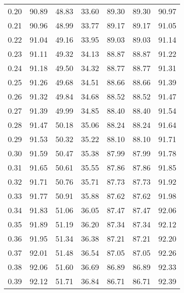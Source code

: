 \begin{tabular}{|c|c|c|c|c|c|c|}
      0.20 &     90.89 &     48.83 &      33.60 &   89.30 &      89.30 &         90.97 \\
      0.21 &     90.96 &     48.99 &      33.77 &   89.17 &      89.17 &         91.05 \\
      0.22 &     91.04 &     49.16 &      33.95 &   89.03 &      89.03 &         91.14 \\
      0.23 &     91.11 &     49.32 &      34.13 &   88.87 &      88.87 &         91.22 \\
      0.24 &     91.18 &     49.50 &      34.32 &   88.77 &      88.77 &         91.31 \\
      0.25 &     91.26 &     49.68 &      34.51 &   88.66 &      88.66 &         91.39 \\
      0.26 &     91.32 &     49.84 &      34.68 &   88.52 &      88.52 &         91.47 \\
      0.27 &     91.39 &     49.99 &      34.85 &   88.40 &      88.40 &         91.54 \\
      0.28 &     91.47 &     50.18 &      35.06 &   88.24 &      88.24 &         91.64 \\
      0.29 &     91.53 &     50.32 &      35.22 &   88.10 &      88.10 &         91.71 \\
      0.30 &     91.59 &     50.47 &      35.38 &   87.99 &      87.99 &         91.78 \\
      0.31 &     91.65 &     50.61 &      35.55 &   87.86 &      87.86 &         91.85 \\
      0.32 &     91.71 &     50.76 &      35.71 &   87.73 &      87.73 &         91.92 \\
      0.33 &     91.77 &     50.91 &      35.88 &   87.62 &      87.62 &         91.98 \\
      0.34 &     91.83 &     51.06 &      36.05 &   87.47 &      87.47 &         92.06 \\
      0.35 &     91.89 &     51.19 &      36.20 &   87.34 &      87.34 &         92.12 \\
      0.36 &     91.95 &     51.34 &      36.38 &   87.21 &      87.21 &         92.20 \\
      0.37 &     92.01 &     51.48 &      36.54 &   87.05 &      87.05 &         92.26 \\
      0.38 &     92.06 &     51.60 &      36.69 &   86.89 &      86.89 &         92.33 \\
      0.39 &     92.12 &     51.71 &      36.84 &   86.71 &      86.71 &         92.39 \\

\end{tabular}
